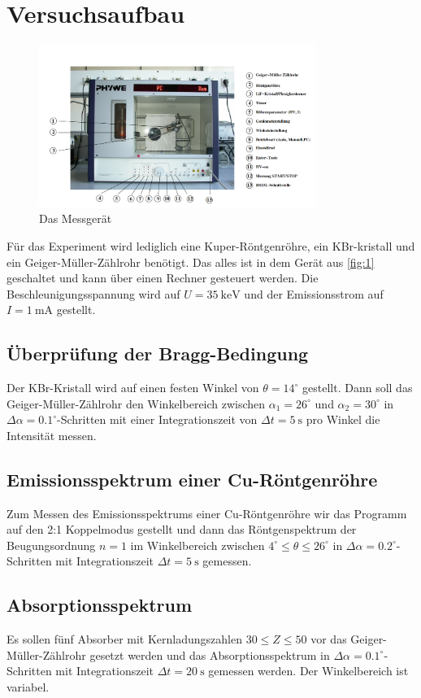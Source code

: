 \documentclass[a4paper]{scrartcl}
\begin{document}
\section{Versuchsaufbau}
\begin{figure}[H]
\centering
  \includegraphics[width=9cm]{1}
  \caption{Das Messgerät}
  \label{fig:1}
\end{figure}
Für das Experiment wird lediglich eine Kuper-Röntgenröhre, ein KBr-kristall und ein Geiger-Müller-Zählrohr benötigt. Das alles ist in dem Gerät aus \autoref{fig:1} geschaltet und kann über einen Rechner gesteuert werden. Die Beschleunigungsspannung wird auf $U=35\ \si{\keV}$ und der Emissionsstrom auf $I=1\ \si{\mA}$ gestellt.

\subsection{Überprüfung der Bragg-Bedingung}
Der KBr-Kristall wird auf einen festen Winkel von $\theta=14^{\circ}$ gestellt. Dann soll das Geiger-Müller-Zählrohr den Winkelbereich zwischen $\alpha_{1}=26^{\circ}$ und $\alpha_{2}=30^{\circ}$ in $\Delta\alpha=0.1^{\circ}$-Schritten mit einer Integrationszeit von $\Delta t=5\ \si{\s}$ pro Winkel die Intensität messen.

\subsection{Emissionsspektrum einer Cu-Röntgenröhre}
Zum Messen des Emissionsspektrums einer Cu-Röntgenröhre wir das Programm auf den 2:1 Koppelmodus gestellt und dann das Röntgenspektrum der Beugungsordnung $n=1$ im Winkelbereich zwischen $4^{\circ}\leq\theta\leq 26^{\circ}$ in $\Delta\alpha=0.2^{\circ}$-Schritten mit Integrationszeit $\Delta t=5\ \si{\s}$ gemessen. 

\subsection{Absorptionsspektrum}
Es sollen fünf Absorber mit Kernladungszahlen $30\leq Z\leq 50$ vor das Geiger-Müller-Zählrohr gesetzt werden und das Absorptionsspektrum in $\Delta\alpha=0.1^{\circ}$-Schritten mit Integrationszeit $\Delta t=20\ \si{\s}$ gemessen werden. Der Winkelbereich ist variabel.
\end{document}
